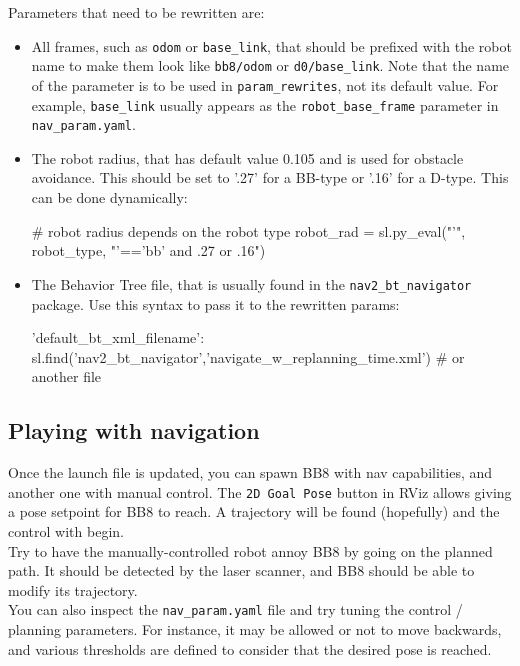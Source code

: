 \documentclass{ecnreport}
\begin{document}
Parameters that need to be rewritten are:
\begin{itemize}
 \item All frames, such as \texttt{odom} or \texttt{base\_link}, that should be prefixed with the robot name to make them look like \texttt{bb8/odom} or \texttt{d0/base\_link}. Note that the name of the parameter is to be used in \texttt{param\_rewrites}, not its default value. For example, \texttt{base\_link} usually appears as the \texttt{robot\_base\_frame} parameter in \texttt{nav\_param.yaml}.
 \item The robot radius, that has default value 0.105 and is used for obstacle avoidance. This should be set to '.27' for a BB-type or '.16' for a D-type. This can be done dynamically:
\begin{pythoncodelarge}
# robot radius depends on the robot type
robot_rad = sl.py_eval("'", robot_type, "'=='bb' and .27 or .16")
\end{pythoncodelarge}
\item The Behavior Tree file, that is usually found in the \texttt{nav2\_bt\_navigator} package. Use this syntax to pass it to the rewritten params:
\begin{pythoncode}
 'default_bt_xml_filename': sl.find('nav2_bt_navigator','navigate_w_replanning_time.xml')   # or another file
\end{pythoncode}
\end{itemize}

\subsection{Playing with navigation}

Once the launch file is updated, you can spawn BB8 with nav capabilities, and another one with manual control. The \texttt{2D Goal Pose} button in RViz allows giving a pose setpoint for BB8 to reach. A trajectory will be found (hopefully) and the control with begin.\\

Try to have the manually-controlled robot annoy BB8 by going on the planned path. It should be detected by the laser scanner, and BB8 should be able to modify its trajectory.\\

You can also inspect the \texttt{nav\_param.yaml} file and try tuning the control / planning parameters. For instance, it may be allowed or not to move backwards, and various thresholds are defined to consider that the desired pose is reached.
\end{document}
